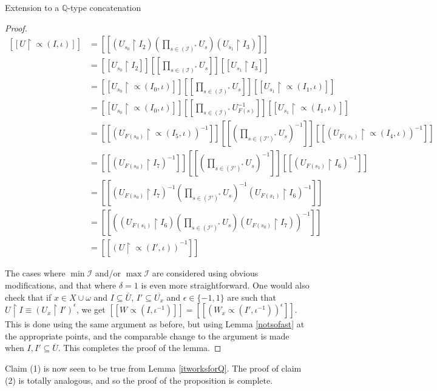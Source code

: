 \documentclass{amsart}
\theoremstyle{definition}\newtheorem{theorem}{Theorem}
\theoremstyle{definition}\newtheorem*{A}{Main Theorem}
\theoremstyle{definition}\newtheorem*{B}{Theorem \ref{elementaryequiv}}
\theoremstyle{definition}\newtheorem*{C}{Theorem \ref{continuous}}
\theoremstyle{definition}\newtheorem*{D}{Theorem \ref{bigisomorphism2}}
\theoremstyle{definition}\newtheorem{bigtheorem}{Main Theorem}
\numberwithin{theorem}{section}
\theoremstyle{definition}\newtheorem{corollary}[theorem]{Corollary}
\theoremstyle{definition}\newtheorem{proposition}[theorem]{Proposition}
\theoremstyle{definition}\newtheorem{definition}[theorem]{Definition}
\theoremstyle{definition}\newtheorem{question}[theorem]{Question}
\theoremstyle{definition}\newtheorem{example}[theorem]{Example}
\theoremstyle{definition}\newtheorem{remark}[theorem]{Remark}
\theoremstyle{definition}\newtheorem{note}[theorem]{Note}
\theoremstyle{definition}\newtheorem{lemma}[theorem]{Lemma}
\theoremstyle{definition}\newtheorem{fact}[theorem]{Fact}
\theoremstyle{definition}\newtheorem{define}[theorem]{Definition}
\theoremstyle{definition}\newtheorem{claim}[theorem]{Claim}
\theoremstyle{definition}\newtheorem{obs}[theorem]{Observation}
\theoremstyle{definition}\newtheorem{definitions}[theorem]{Definitions}
\begin{document}
\begin{section}{Extension to a $\mathbb{Q}$-type concatenation}
\begin{proof}
$$
\begin{array}{ll}
[[U\upharpoonright \varpropto(I, \iota)]] & = [[(U_{s_0} \upharpoonright I_2)(\prod_{s \in (\mathcal{I})^*}U_s)(U_{s_1}\upharpoonright I_3)]]\\
& = [[U_{s_0} \upharpoonright I_2]][[\prod_{s \in (\mathcal{I})^*}U_s]][[U_{s_1}\upharpoonright I_3]]\\
& = [[U_{s_0} \upharpoonright \varpropto(I_0, \iota)]][[\prod_{s \in (\mathcal{I})^*}U_s]][[U_{s_1}\upharpoonright \varpropto(I_1, \iota)]]\\
& = [[U_{s_0} \upharpoonright \varpropto(I_0, \iota)]][[\prod_{s \in (\mathcal{I})^*}U_{F(s)}^{-1}]][[U_{s_1}\upharpoonright \varpropto(I_1, \iota)]]\\
& = [[(U_{F(s_0)} \upharpoonright \varpropto(I_5, \iota))^{-1}]][[(\prod_{s \in (\mathcal{I}')^*}U_s)^{-1}]][[(U_{F(s_1)}\upharpoonright \varpropto(I_4, \iota))^{-1}]]\\
& = [[(U_{F(s_0)} \upharpoonright I_7)^{-1}]][[(\prod_{s \in (\mathcal{I}')^*}U_s)^{-1}]][[(U_{F(s_1)}\upharpoonright I_6)^{-1}]]\\
& = [[(U_{F(s_0)} \upharpoonright I_7)^{-1}(\prod_{s \in (\mathcal{I}')^*}U_s)^{-1}(U_{F(s_1)}\upharpoonright I_6)^{-1}]]\\
& = [[((U_{F(s_1)}\upharpoonright I_6)(\prod_{s \in (\mathcal{I}')^*}U_s)(U_{F(s_0)} \upharpoonright I_7))^{-1}]]\\
& = [[(U \upharpoonright \varpropto(I', \iota))^{-1}]]


\end{array}
$$

The cases where $\min\mathcal{I}$ and/or $\max\mathcal{I}$ are considered using obvious modifications, and that where $\delta = 1$ is even more straightforward.  One would also check that if $x \in X \cup \omega$ and $I \subseteq \overline{U}$, $I' \subseteq \overline{U_x}$ and $\epsilon \in \{-1, 1\}$ are such that $U \upharpoonright I \equiv (U_x \upharpoonright I')^{\epsilon}$, we get $[[W \varpropto(I, \iota^{-1})]] = [[(W_x \varpropto(I', \iota^{-1}))^{\epsilon}]]$.  This is done using the same argument as before, but using Lemma \ref{notsofast} at the appropriate points, and the comparable change to the argument is made when $I, I' \subseteq \overline{U}$.  This completes the proof of the lemma.

\end{proof}

Claim (1) is now seen to be true from Lemma \ref{itworksforQ}.  The proof of claim (2) is totally analogous, and so the proof of the proposition is complete.

\end{section}
\end{document}

